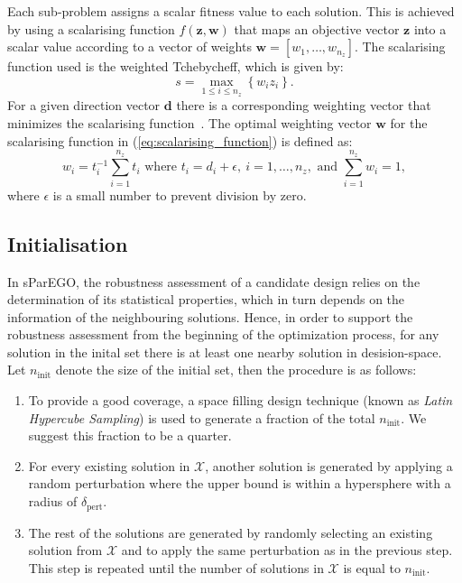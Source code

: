 \documentclass{llncs}
\newcommand{\vz}{\mathbf{z}} %
\newcommand{\vw}{\mathbf{w}} %
\newcommand{\vd}{\mathbf{d}} %
\newcommand{\XSet}{\mathcal{X}} %
\begin{document}
Each sub-problem assigns a scalar fitness value to each solution. This is achieved by using a scalarising function $f(\vz,\vw)$ that maps an objective vector $\vz$ into a scalar value according to a vector of weights $\vw=[w_1,\ldots,w_{n_z}]$. The scalarising function used is the weighted Tchebycheff, which is given by:
\begin{equation}
 s = \max\limits_{1\leq i \leq n_z} \left\{ w_i z_i \right\}.
 \label{eq:scalarising_function}
\end{equation}
For a given direction vector $\vd$ there is a corresponding weighting vector that minimizes the scalarising function~\cite{bib:generational_distance}. The optimal weighting vector $\vw$ for the scalarising function in (\ref{eq:scalarising_function}) is defined as:
\begin{equation}
w_i=t_i^{-1} \sum_{i=1}^{n_z} t_i \text{ where } t_i = d_i+\epsilon, ~i=1,\ldots,n_z, \text{ and } \sum_{i=1}^{n_z} w_i=1,
\end{equation}
where $\epsilon$ is a small number to prevent division by zero.

\subsection{Initialisation}\label{subsec:initialisation}

In sParEGO, the robustness assessment of a candidate design relies on the determination of its statistical properties, which in turn depends on the information of the neighbouring solutions. Hence, in order to support the robustness assessment from the beginning of the optimization process, for any solution in the inital set there is at least one nearby solution in desision-space. Let $n_{\text{init}}$ denote the size of the initial set, then the procedure is as follows:
\begin{enumerate}
 \item To provide a good coverage, a space filling design technique (known as \textit{Latin Hypercube Sampling}) is used to generate a fraction of the total $n_{\text{init}}$. We suggest this fraction to be a quarter.
 
 \item For every existing solution in $\XSet$, another solution is generated by applying a random perturbation where the upper bound is within a hypersphere with a radius of $\delta_\text{pert}$.
 
 \item The rest of the solutions are generated by randomly selecting an existing solution from $\XSet$ and to apply the same perturbation as in the previous step. This step is repeated until the number of solutions in $\XSet$ is equal to $n_{\text{init}}$.
\end{enumerate}
\end{document}
